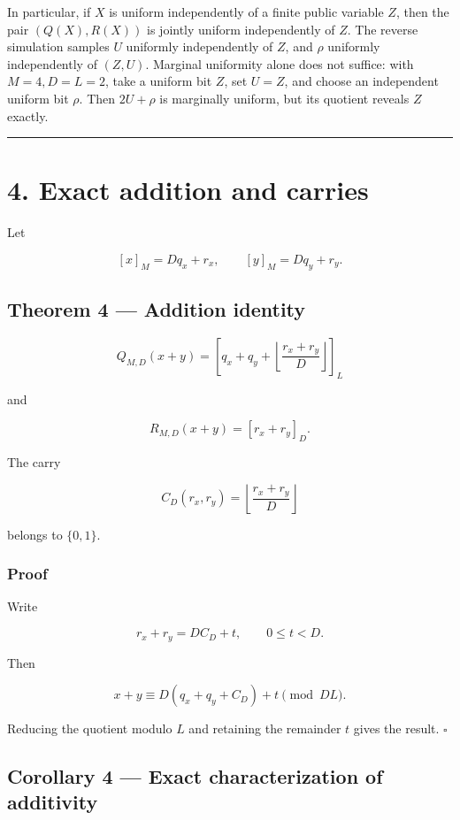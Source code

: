 \documentclass[11pt,a4paper]{article}
\begin{document}
In particular, if \(X\) is uniform independently of a finite public variable \(Z\), then the pair \((Q(X),R(X))\) is jointly uniform independently of \(Z\). The reverse simulation samples \(U\) uniformly independently of \(Z\), and \(\rho\) uniformly independently of \((Z,U)\). Marginal uniformity alone does not suffice: with \(M=4,D=L=2\), take a uniform bit \(Z\), set \(U=Z\), and choose an independent uniform bit \(\rho\). Then \(2U+\rho\) is marginally uniform, but its quotient reveals \(Z\) exactly.

\begin{center}\rule{0.5\linewidth}{0.5pt}\end{center}

\section{4. Exact addition and carries}\label{exact-addition-and-carries}

Let

\[
[x]_M=Dq_x+r_x,\qquad
[y]_M=Dq_y+r_y.
\]

\subsection{Theorem 4 --- Addition identity}\label{theorem-4-addition-identity}

\[
\boxed{
Q_{M,D}(x+y)
=
\left[
q_x+q_y+
\left\lfloor\frac{r_x+r_y}{D}\right\rfloor
\right]_L
}
\]

and

\[
\boxed{
R_{M,D}(x+y)
=
[r_x+r_y]_D.
}
\]

The carry

\[
C_D(r_x,r_y)
=
\left\lfloor\frac{r_x+r_y}{D}\right\rfloor
\]

belongs to \(\{0,1\}\).

\subsubsection{Proof}\label{proof-2}

Write

\[
r_x+r_y=D C_D+t,\qquad0\le t<D.
\]

Then

\[
x+y\equiv
D(q_x+q_y+C_D)+t\pmod{DL}.
\]

Reducing the quotient modulo \(L\) and retaining the remainder \(t\) gives the result. \(\square\)

\subsection{Corollary 4 --- Exact characterization of additivity}\label{corollary-4-exact-characterization-of-additivity}
\end{document}
